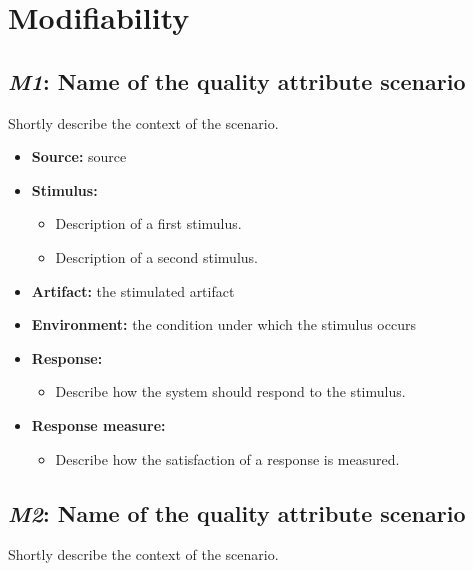 \documentclass[english]{sareport}
\begin{document}
\section{Modifiability}
\subsection{\emph{M1}: Name of the quality attribute scenario}
Shortly describe the context of the scenario.

\begin{itemize}
    \item \textbf{Source:} source
    \item \textbf{Stimulus:}
        \begin{itemize}
            \item Description of a first stimulus.
            \item Description of a second stimulus.
        \end{itemize}

    \item \textbf{Artifact:} the stimulated artifact
    \item \textbf{Environment:} the condition under which the stimulus occurs
    \item \textbf{Response:}
        \begin{itemize}
            \item Describe how the system should respond to the stimulus.
        \end{itemize}

    \item \textbf{Response measure:}
        \begin{itemize}
            \item Describe how the satisfaction of a response is measured.
        \end{itemize}
\end{itemize}

\subsection{\emph{M2}: Name of the quality attribute scenario}
Shortly describe the context of the scenario.
\end{document}
